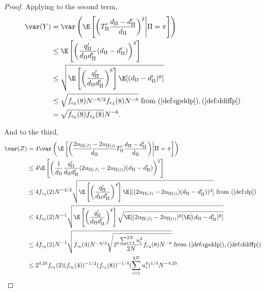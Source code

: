 \begin{proof}
  Applying to the second term,
  \begin{align*}
    \var(Y) &= \var \left ( \E \left [ \left ( T'_{\Pi}\frac{d_{\Pi}-d_{\Pi}'}{d_{\Pi}} \right )^2
        \middle | \Pi = \pi \right ] \right ) \\
    &\leq \E \left [ \left ( \frac{q_{\Pi}'}{d_{\Pi}d_{\Pi}'} (d_{\Pi}-d_{\Pi}') \right )^4 \right ] \\
    &\leq \sqrt{\E \left [ \left ( \frac{q_{\Pi}'}{d_{\Pi}d_{\Pi}'} \right )^8 \right ]
      \E [(d_{\Pi}-d_{\Pi}')^8]} \\
    &\leq \sqrt{f_{c_6}(8) N^{-8/2} f_{c_4}(8) N^{-8}} \text{ from }
    (\ref{def:qpddp}),(\ref{def:ddiffp}) \\
    &= \sqrt{f_{c_6}(8)f_{c_4}(8)}N^{-6}.
  \end{align*}

  And to the third,
  \begin{align*}
    \var(Z) &= 4 \var \left ( \E \left [ \left ( \frac{2u_{\Pi(J)}-2u_{\Pi(i)}}{d_{\Pi}}
          T_{\Pi}'\frac{d_{\Pi}-d_{\Pi}'}{d_{\Pi}} \right ) \middle | \Pi = \pi \right ] \right ) \\
    &\leq 4 \E \left [ \left ( \frac{1}{d_{\Pi}} \frac{q_{\Pi}'}{d_{\Pi}d_{\Pi}'}
        (2u_{\Pi(J)}-2u_{\Pi(i)})(d_{\Pi}-d_{\Pi}') \right )^2 \right ] \\
    &\leq 4 f_{c_2}(2) N^{-2/2} \sqrt{\E \left [ \left (
          \frac{q_{\Pi}'}{d_{\Pi}d_{\Pi}'} \right )^4 \right ] \E[((2u_{\Pi(J)}-2u_{\Pi(i)})(d_{\Pi}-d_{\Pi}'))^4]
    } \text{ from } (\ref{def:dp}) \\
    &\leq 4 f_{c_2}(2) N^{-1} \sqrt{\E \left [ \left (
          \frac{q_{\Pi}'}{d_{\Pi}d_{\Pi}'} \right )^4 \right ] \sqrt{\E[(2u_{\Pi(J)}-2u_{\Pi(i)})^8]
      \E[(d_{\Pi}-d_{\Pi}')^8]}} \\
    &\leq 4 f_{c_2}(2) N^{-1} \sqrt{f_{c_6}(4) N^{-4/2} \sqrt{2^9
        \frac{\sum_{i=1}^{2N}u_{i}^4}{2N} f_{c_4}(8) N^{-8}}}
    \text{ from } (\ref{def:qpddp}),(\ref{def:ddiffp}) \\
    &\leq 2^{4.25}f_{c_2}(2) (f_{c_6}(4))^{-1/2} (f_{c_4}(8))^{-1/4}
    (\sum_{i=1}^{2N}u_{i}^4)^{1/4} N^{-4.25}
  \end{align*}


\end{proof}
